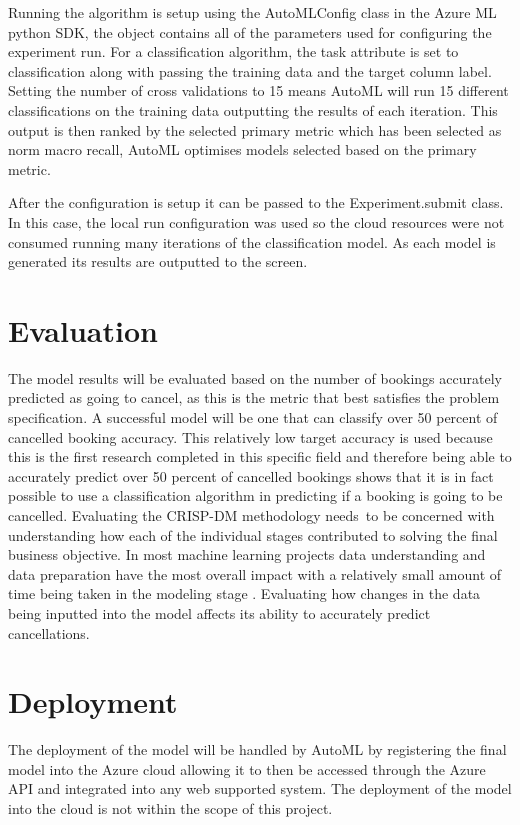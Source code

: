 Running the algorithm is setup using the AutoMLConfig class in the Azure ML python SDK, the object contains all of the parameters used for configuring the experiment run. For a classification algorithm, the task attribute is set to classification along with passing the training data and the target column label. Setting the number of cross validations to 15 means AutoML will run 15 different classifications on the training data outputting the results of each iteration. This output is then ranked by the selected primary metric which has been selected as norm macro recall, AutoML optimises models selected based on the primary metric. 

\vspace{5mm}

After the configuration is setup it can be passed to the Experiment.submit class. In this case, the local run configuration was used so the cloud resources were not consumed running many iterations of the classification model. As each model is generated its results are outputted to the screen.

\section{Evaluation}

The model results will be evaluated based on the number of bookings accurately predicted as going to cancel, as this is the metric that best satisfies the problem specification. A successful model will be one that can classify over 50 percent of cancelled booking accuracy. This relatively low target accuracy is used because this is the first research completed in this specific field and therefore being able to accurately predict over 50 percent of cancelled bookings shows that it is in fact possible to use a classification algorithm in predicting if a booking is going to be cancelled. Evaluating the CRISP-DM methodology needs to be concerned with understanding how each of the individual stages contributed to solving the final business objective. In most machine learning projects data understanding and data preparation have the most overall impact with a relatively small amount of time being taken in the modeling stage \cite{Polyzotis2018DataSurvey}. Evaluating how changes in the data being inputted into the model affects its ability to accurately predict cancellations.

\section{Deployment}

The deployment of the model will be handled by AutoML by registering the final model into the Azure cloud allowing it to then be accessed through the Azure API and integrated into any web supported system. The deployment of the model into the cloud is not within the scope of this project.



